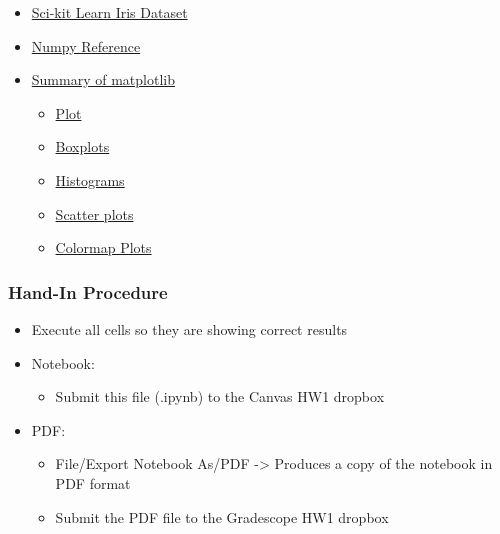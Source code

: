 \documentclass[11pt]{article}
\providecommand{\tightlist}{%
      \setlength{\itemsep}{0pt}\setlength{\parskip}{0pt}}
\begin{document}
\begin{itemize}
\tightlist
\item
  \href{https://scikit-learn.org/stable/modules/generated/sklearn.datasets.load_iris.html}{Sci-kit
  Learn Iris Dataset}
\item
  \href{https://docs.scipy.org/doc/numpy/reference/index.html}{Numpy
  Reference}
\item
  \href{https://matplotlib.org/3.1.1/api/pyplot_summary.html}{Summary of
  matplotlib}

  \begin{itemize}
  \tightlist
  \item
    \href{https://matplotlib.org/3.1.1/api/_as_gen/matplotlib.pyplot.plot.html}{Plot}
  \item
    \href{https://matplotlib.org/3.1.1/api/_as_gen/matplotlib.pyplot.boxplot.html}{Boxplots}
  \item
    \href{https://matplotlib.org/3.1.1/api/_as_gen/matplotlib.pyplot.hist.html\#matplotlib.pyplot.hist}{Histograms}
  \item
    \href{https://matplotlib.org/3.1.1/api/_as_gen/matplotlib.pyplot.scatter.html\#matplotlib.pyplot.scatter}{Scatter
    plots}
  \item
    \href{https://matplotlib.org/3.1.1/api/_as_gen/matplotlib.pyplot.imshow.html}{Colormap
    Plots}
  \end{itemize}
\end{itemize}

\hypertarget{hand-in-procedure}{%
\subsubsection{Hand-In Procedure}\label{hand-in-procedure}}

\begin{itemize}
\tightlist
\item
  Execute all cells so they are showing correct results
\item
  Notebook:

  \begin{itemize}
  \tightlist
  \item
    Submit this file (.ipynb) to the Canvas HW1 dropbox
  \end{itemize}
\item
  PDF:

  \begin{itemize}
  \tightlist
  \item
    File/Export Notebook As/PDF -\textgreater{} Produces a copy of the
    notebook in PDF format
  \item
    Submit the PDF file to the Gradescope HW1 dropbox
  \end{itemize}
\end{itemize}
\end{document}
